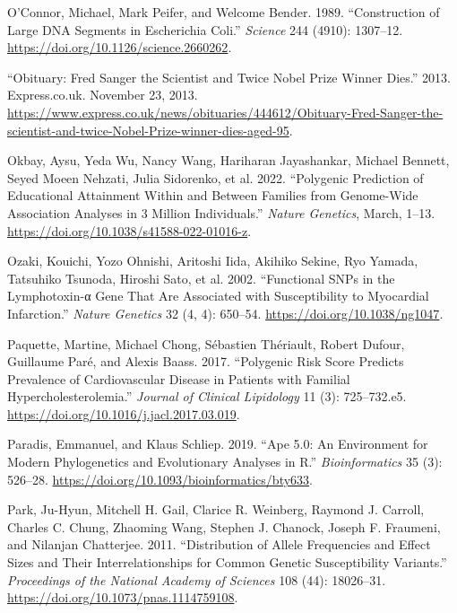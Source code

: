 \documentclass[
]{book}
\newlength{\cslhangindent}
\newlength{\cslentryspacingunit} %
\newenvironment{CSLReferences}[2] %
 {%
  \setlength{\parindent}{0pt}
  \ifodd #1
  \let\oldpar\par
  \def\par{\hangindent=\cslhangindent\oldpar}
  \fi
  \setlength{\parskip}{#2\cslentryspacingunit}
 }%
 {}
\begin{document}
\begin{CSLReferences}{1}{0}
\leavevmode{}%
O'Connor, Michael, Mark Peifer, and Welcome Bender. 1989. {``Construction of {Large DNA Segments} in {Escherichia} Coli.''} \emph{Science} 244 (4910): 1307--12. \url{https://doi.org/10.1126/science.2660262}.

\leavevmode{}%
{``Obituary: {Fred Sanger} the Scientist and Twice {Nobel Prize} Winner Dies.''} 2013. {Express.co.uk}. November 23, 2013. \url{https://www.express.co.uk/news/obituaries/444612/Obituary-Fred-Sanger-the-scientist-and-twice-Nobel-Prize-winner-dies-aged-95}.

\leavevmode{}%
Okbay, Aysu, Yeda Wu, Nancy Wang, Hariharan Jayashankar, Michael Bennett, Seyed Moeen Nehzati, Julia Sidorenko, et al. 2022. {``Polygenic Prediction of Educational Attainment Within and Between Families from Genome-Wide Association Analyses in 3 Million Individuals.''} \emph{Nature Genetics}, March, 1--13. \url{https://doi.org/10.1038/s41588-022-01016-z}.

\leavevmode{}%
Ozaki, Kouichi, Yozo Ohnishi, Aritoshi Iida, Akihiko Sekine, Ryo Yamada, Tatsuhiko Tsunoda, Hiroshi Sato, et al. 2002. {``Functional {SNPs} in the Lymphotoxin-α Gene That Are Associated with Susceptibility to Myocardial Infarction.''} \emph{Nature Genetics} 32 (4, 4): 650--54. \url{https://doi.org/10.1038/ng1047}.

\leavevmode{}%
Paquette, Martine, Michael Chong, Sébastien Thériault, Robert Dufour, Guillaume Paré, and Alexis Baass. 2017. {``Polygenic Risk Score Predicts Prevalence of Cardiovascular Disease in Patients with Familial Hypercholesterolemia.''} \emph{Journal of Clinical Lipidology} 11 (3): 725--732.e5. \url{https://doi.org/10.1016/j.jacl.2017.03.019}.

\leavevmode{}%
Paradis, Emmanuel, and Klaus Schliep. 2019. {``Ape 5.0: An Environment for Modern Phylogenetics and Evolutionary Analyses in {R}.''} \emph{Bioinformatics} 35 (3): 526--28. \url{https://doi.org/10.1093/bioinformatics/bty633}.

\leavevmode{}%
Park, Ju-Hyun, Mitchell H. Gail, Clarice R. Weinberg, Raymond J. Carroll, Charles C. Chung, Zhaoming Wang, Stephen J. Chanock, Joseph F. Fraumeni, and Nilanjan Chatterjee. 2011. {``Distribution of Allele Frequencies and Effect Sizes and Their Interrelationships for Common Genetic Susceptibility Variants.''} \emph{Proceedings of the National Academy of Sciences} 108 (44): 18026--31. \url{https://doi.org/10.1073/pnas.1114759108}.


\end{CSLReferences}
\end{document}
